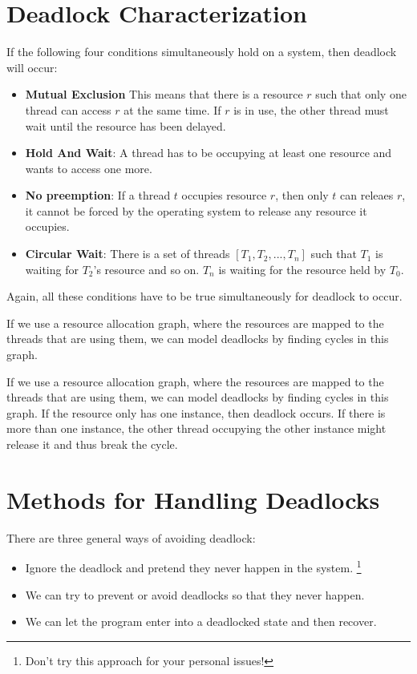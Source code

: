 \documentclass{tufte-handout}
\begin{document}
\section{Deadlock Characterization}

If the following four conditions simultaneously hold on a system, then deadlock will 
occur:

\begin{itemize}
	\item \textbf{Mutual Exclusion} This means that there is a resource $r$ such that 
			only one thread can access $r$ at the same time. If $r$ is in use, 
			the other thread must wait until the resource has been delayed.
	\item \textbf{Hold And Wait}: A thread has to be occupying at least one resource
			and wants to access one more.
	\item \textbf{No preemption}: If a thread $t$ occupies resource $r$, then only 
			$t$ can releaes $r$, it cannot be forced by the operating system to release
			any resource it occupies.
	\item \textbf{Circular Wait}: There is a set of threads $[T_{1}, T_{2}, ... ,T_{n}]$
			such that $T_{1}$ is waiting for $T_{2}$'s resource and so on. $T_{n}$ is 		
			waiting for the resource held by $T_{0}$.
\end{itemize}

Again, all these conditions have to be true simultaneously for deadlock to occur.

If we use a resource allocation graph, where the resources are mapped to the threads
that are using them, we can model deadlocks by finding cycles in this graph.

If we use a resource allocation graph, where the resources are mapped to the threads
that are using them, we can model deadlocks by finding cycles in this graph. If the 
resource only has one instance, then deadlock occurs. If there is more than one 
instance, the other thread occupying the other instance might release it and thus 
break the cycle.

\section{Methods for Handling Deadlocks}

There are three general ways of avoiding deadlock: 
\begin{itemize}
	\item Ignore the deadlock and pretend they never happen in the system.
\footnote{Don't try this approach for your personal issues!}
	\item  We can try to prevent or avoid deadlocks so that they never happen.
	\item  We can let the program enter into a deadlocked state and then recover.
\end{itemize}
\end{document}
